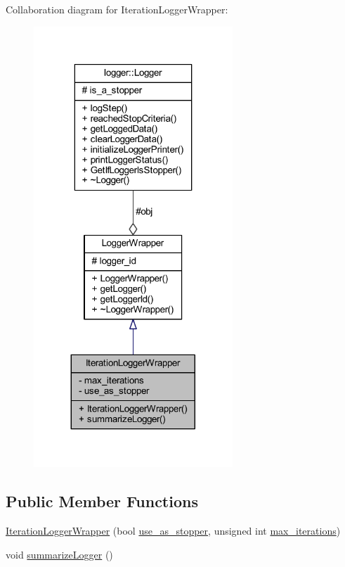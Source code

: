 Collaboration diagram for Iteration\+Logger\+Wrapper\+:\nopagebreak
\begin{figure}[H]
\begin{center}
\leavevmode
\includegraphics[width=212pt]{class_iteration_logger_wrapper__coll__graph}
\end{center}
\end{figure}
\subsection*{Public Member Functions}
\begin{DoxyCompactItemize}
\item 
\mbox{\hyperlink{class_iteration_logger_wrapper_a7d4c0052811a3bbb921cdb31be2c77f5}{Iteration\+Logger\+Wrapper}} (bool \mbox{\hyperlink{class_iteration_logger_wrapper_ae3ae6a45a08aeb251ad15282ebc6794d}{use\+\_\+as\+\_\+stopper}}, unsigned int \mbox{\hyperlink{class_iteration_logger_wrapper_a558ed3722fe17ab31c6463e8dbda7ccc}{max\+\_\+iterations}})
\item 
void \mbox{\hyperlink{class_iteration_logger_wrapper_a8b5276c1c6bea1ee5fceac5d4b03acee}{summarize\+Logger}} ()
\end{DoxyCompactItemize}

